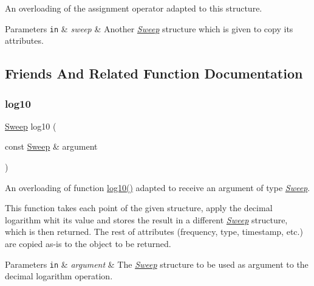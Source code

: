 An overloading of the assignment operator adapted to this structure. 


\begin{DoxyParams}[1]{Parameters}
\mbox{\tt in}  & {\em sweep} & Another {\itshape \hyperlink{structSweep}{Sweep}} structure which is given to copy its attributes. \\
\hline
\end{DoxyParams}


\subsection{Friends And Related Function Documentation}
\mbox{\label{structSweep_a37df38f37b1cf6a6bfb18f44b706d308}} 
\subsubsection{\texorpdfstring{log10}{log10}}
{\footnotesize\ttfamily \hyperlink{structSweep}{Sweep} log10 (\begin{DoxyParamCaption}\item[{const \hyperlink{structSweep}{Sweep} \&}]{argument }\end{DoxyParamCaption})\hspace{0.3cm}{\ttfamily [friend]}}



An overloading of function {\ttfamily \hyperlink{structSweep_a37df38f37b1cf6a6bfb18f44b706d308}{log10()}} adapted to receive an argument of type {\itshape \hyperlink{structSweep}{Sweep}}. 

This function takes each point of the given structure, apply the decimal logarithm whit its value and stores the result in a different {\itshape \hyperlink{structSweep}{Sweep}} structure, which is then returned. The rest of attributes (frequency, type, timestamp, etc.) are copied as-\/is to the object to be returned. 
\begin{DoxyParams}[1]{Parameters}
\mbox{\tt in}  & {\em argument} & The {\itshape \hyperlink{structSweep}{Sweep}} structure to be used as argument to the decimal logarithm operation. \\
\hline
\end{DoxyParams}
\mbox{\label{structSweep_a4739da92a36e5f8f17b0be140dd327f6}} 
